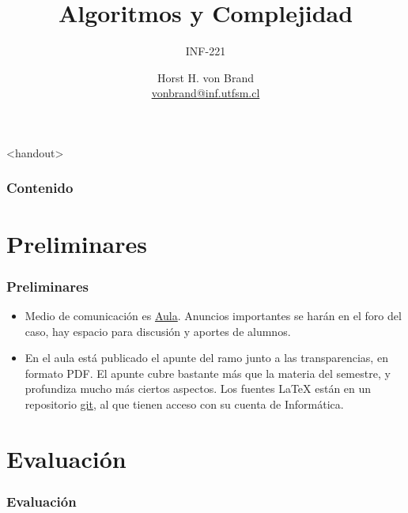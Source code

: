 \documentclass[english, spanish, fleqn%
hyperref = {colorlinks, urlcolor = blue}%
]{beamer}
\title{Algoritmos y Complejidad}
\subtitle{INF-221}
\author[Horst H. von Brand]{Horst H. von Brand\\
  \href{mailto:vonbrand@inf.utfsm.cl}{vonbrand@inf.utfsm.cl}}
\institute[DI UTFSM]{Departamento de Informática\\
                     Universidad Técnica Federico Santa María}
\date{}
\begin{document}
\frame{\maketitle}

\begin{frame}<handout>
  \frametitle{Contenido}

  \tableofcontents
\end{frame}

\section{Preliminares}

\begin{frame}
  \setcounter{beamerpauses}{2}
  \frametitle{Preliminares}

  \begin{itemize}
  \item
    Medio de comunicación es \href{http://aula.usm.cl}{Aula}.
    Anuncios importantes se harán en el foro del caso,
    hay espacio para discusión y aportes de alumnos.
  \item
    En el aula está publicado el apunte del ramo
    junto a las transparencias,
    en formato PDF.
    El apunte cubre bastante más que la materia del semestre,
    y profundiza mucho más ciertos aspectos.
    Los fuentes \LaTeX{} están en un repositorio
    \href{https://gitlab.labcomp.cl/vonbrand/clases_INF-221}{git},
    al que tienen acceso con su cuenta de Informática.
  \end{itemize}
\end{frame}

\section{Evaluación}

\begin{frame}
  \setcounter{beamerpauses}{2}
  \frametitle{Evaluación}




\end{frame}
\end{document}
